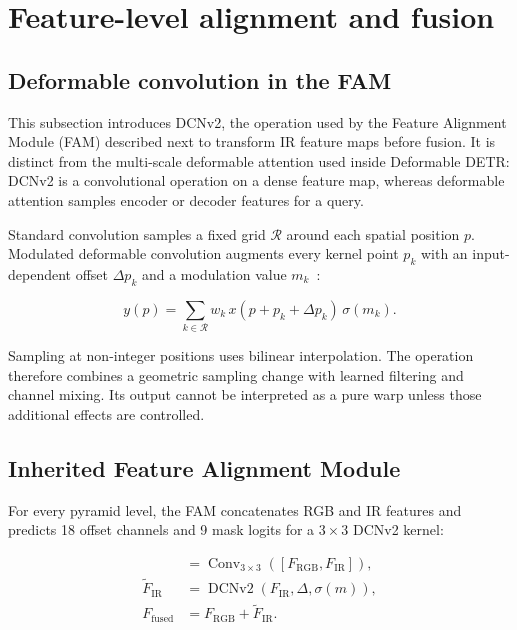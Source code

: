 \section{Feature-level alignment and fusion}

\subsection{Deformable convolution in the FAM}

This subsection introduces DCNv2, the operation used by the Feature Alignment
Module (FAM) described next to transform IR feature maps before fusion. It is
distinct from the multi-scale deformable attention used inside Deformable DETR:
DCNv2 is a convolutional operation on a dense feature map, whereas deformable
attention samples encoder or decoder features for a query.

Standard convolution samples a fixed grid \(\mathcal{R}\) around each spatial
position \(p\). Modulated deformable convolution augments every kernel point
\(p_k\) with an input-dependent offset \(\Delta p_k\) and a modulation value
\(m_k\)~\cite{zhu2019dcnv2}:

\begin{equation}
  y(p)=\sum_{k\in\mathcal{R}}
  w_k\,x(p+p_k+\Delta p_k)\,\sigma(m_k).
  \label{eq:dcnv2}
\end{equation}

Sampling at non-integer positions uses bilinear interpolation. The operation
therefore combines a geometric sampling change with learned filtering and
channel mixing. Its output cannot be interpreted as a pure warp unless those
additional effects are controlled.

\subsection{Inherited Feature Alignment Module}

For every pyramid level, the FAM concatenates RGB and IR features and predicts
18 offset channels and 9 mask logits for a \(3\times3\) DCNv2 kernel:

\begin{align}
  [\Delta,m] &=
  \operatorname{Conv}_{3\times3}
  \left([F_{\mathrm{RGB}},F_{\mathrm{IR}}]\right),\\
  \widetilde{F}_{\mathrm{IR}} &=
  \operatorname{DCNv2}(F_{\mathrm{IR}},\Delta,\sigma(m)),\\
  F_{\mathrm{fused}} &= F_{\mathrm{RGB}}+
  \widetilde{F}_{\mathrm{IR}}.
  \label{eq:fam-fusion}
\end{align}

